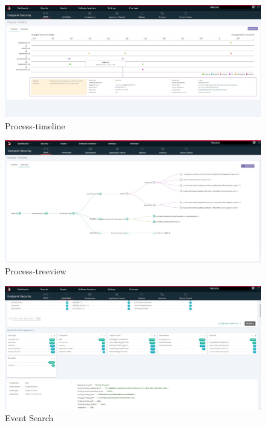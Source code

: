 \documentclass{article}
\begin{document}
\begin{figure}[H]
    \centering
    \includegraphics[width=1\textwidth]{Process-timeline.jpg}
    \caption{Process-timeline}
    \label{fig:process-timeline}
\end{figure}



\begin{figure}[H]
    \centering
    \includegraphics[width=1\textwidth]{Process-treeview.jpg}
    \caption{Process-treeview}
    \label{fig:process-treeview}
\end{figure}


\begin{figure}[H]
    \centering
    \includegraphics[width=1\textwidth]{Event-search.jpg}
    \caption{Event Search}
    \label{fig:event-search}
\end{figure}
\end{document}
